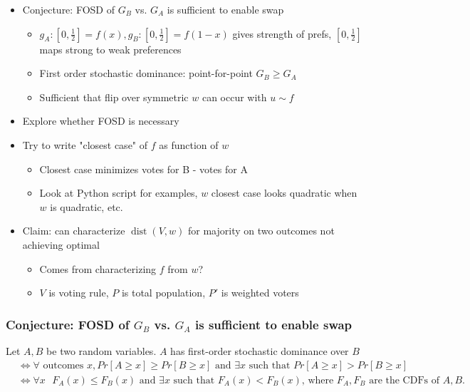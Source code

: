 \documentclass[12pt]{article}
\begin{document}
\begin{itemize}[nolistsep]
    \item Conjecture: FOSD of $G_B$ vs. $G_A$ is sufficient to enable swap
        \begin{itemize}[nolistsep]
            \item $g_A: [0, \frac{1}{2}] = f(x), g_B: [0, \frac{1}{2}] = f(1 - x)$ gives strength of prefs, $[0, \frac{1}{2}]$ maps strong to weak preferences 
            \item First order stochastic dominance: point-for-point $G_B \geq G_A$
            \item Sufficient that flip over symmetric $w$ can occur with $u \sim f$
        \end{itemize}
    \item Explore whether FOSD is necessary
    \item Try to write "closest case" of $f$ as function of $w$
        \begin{itemize}[nolistsep]
            \item Closest case minimizes votes for B - votes for A
            \item Look at Python script for examples, $w$ closest case looks quadratic when $w$ is quadratic, etc.
        \end{itemize}
    \item Claim: can characterize $\operatorname{dist}(V, w)$ for majority on two outcomes not achieving optimal
        \begin{itemize}[nolistsep]
            \item Comes from characterizing $f$ from $w$?
            \item $V$ is voting rule, $P$ is total population, $P'$ is weighted voters
        \end{itemize}
\end{itemize}

\subsubsection*{Conjecture: FOSD of $G_B$ vs. $G_A$ is sufficient to enable swap}

Let $A, B$ be two random variables. $A$ has first-order stochastic dominance over $B$ 
\begin{align*}
    &\iff \forall\text{ outcomes } x, Pr[A \geq x] \geq Pr[B \geq x]\text{ and }\exists x\text{ such that } Pr[A \geq x] > Pr[B \geq x] \\
    &\iff \forall x\text{ }F_A(x) \leq F_B(x)\text{ and }\exists x\text{ such that } F_A(x) < F_B(x)\text{, where }F_A, F_B\text{ are the CDFs of }A, B.
\end{align*}
\end{document}
